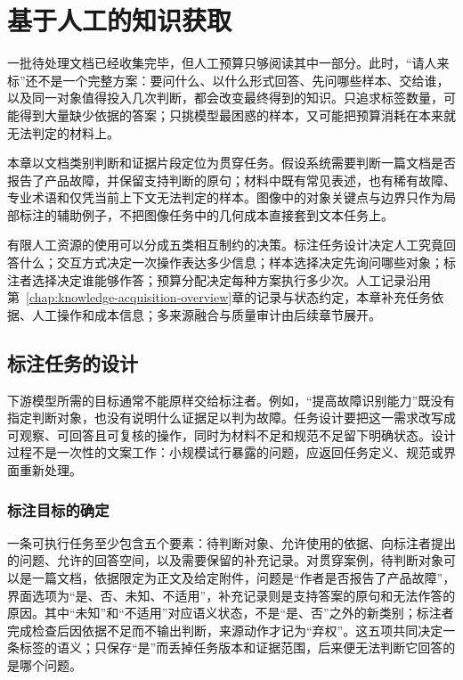 \chapter{基于人工的知识获取}
\label{chap:knowledge-acquisition-human}

一批待处理文档已经收集完毕，但人工预算只够阅读其中一部分。此时，“请人来标”还不是一个完整方案：要问什么、以什么形式回答、先问哪些样本、交给谁，以及同一对象值得投入几次判断，都会改变最终得到的知识。只追求标签数量，可能得到大量缺少依据的答案；只挑模型最困惑的样本，又可能把预算消耗在本来就无法判定的材料上。

本章以文档类别判断和证据片段定位为贯穿任务。假设系统需要判断一篇文档是否报告了产品故障，并保留支持判断的原句；材料中既有常见表述，也有稀有故障、专业术语和仅凭当前上下文无法判定的样本。图像中的对象关键点与边界只作为局部标注的辅助例子，不把图像任务中的几何成本直接套到文本任务上。

有限人工资源的使用可以分成五类相互制约的决策。标注任务设计决定人工究竟回答什么；交互方式决定一次操作表达多少信息；样本选择决定先询问哪些对象；标注者选择决定谁能够作答；预算分配决定每种方案执行多少次。人工记录沿用第~\ref{chap:knowledge-acquisition-overview}章的记录与状态约定，本章补充任务依据、人工操作和成本信息；多来源融合与质量审计由后续章节展开。

\section{标注任务的设计}
\label{sec:knowledge-acquisition-human-task-design}

下游模型所需的目标通常不能原样交给标注者。例如，“提高故障识别能力”既没有指定判断对象，也没有说明什么证据足以判为故障。任务设计要把这一需求改写成可观察、可回答且可复核的操作，同时为材料不足和规范不足留下明确状态。设计过程不是一次性的文案工作：小规模试行暴露的问题，应返回任务定义、规范或界面重新处理。

\subsection{标注目标的确定}
\label{sec:knowledge-acquisition-human-task-objective}

一条可执行任务至少包含五个要素：待判断对象、允许使用的依据、向标注者提出的问题、允许的回答空间，以及需要保留的补充记录。对贯穿案例，待判断对象可以是一篇文档，依据限定为正文及给定附件，问题是“作者是否报告了产品故障”，界面选项为“是、否、未知、不适用”，补充记录则是支持答案的原句和无法作答的原因。其中“未知”和“不适用”对应语义状态，不是“是、否”之外的新类别；标注者完成检查后因依据不足而不输出判断，来源动作才记为“弃权”。这五项共同决定一条标签的语义；只保存“是”而丢掉任务版本和证据范围，后来便无法判断它回答的是哪个问题。

